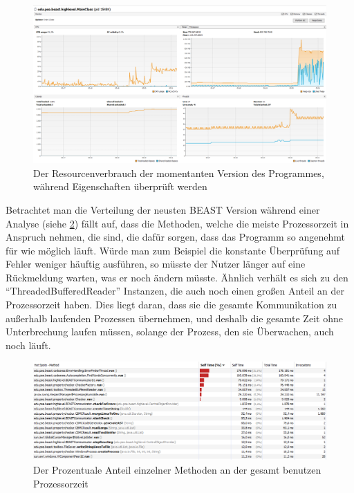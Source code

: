 ﻿\documentclass[a4paper]{scrreprt}
\begin{document}
\vspace{4cm}

\begin{figure}[ht]
	\centering
  \includegraphics[width=1.0\textwidth,
  height=0.40\textwidth]{images/NEW_YES.png} \caption{Der Resourcenverbrauch der
  momentanten Version des Programmes, während Eigenschaften überprüft werden}
	\label{fig4}
\end{figure}

\newpage
Betrachtet man die Verteilung der neusten BEAST Version während einer
Analyse (siehe \ref{fig5}) fällt auf, dass die Methoden, welche die meiste
Prozessorzeit in Anspruch nehmen, die sind, die dafür sorgen, dass das Programm
so angenehmt für wie möglich läuft. Würde man zum Beispiel die konstante
Überprüfung auf Fehler weniger häuftig ausführen, so müsste der Nutzer länger auf eine
Rückmeldung warten, was er noch ändern müsste. Ähnlich verhält es sich zu den
"`ThreadedBufferedReader"' Instanzen, die auch noch einen großen Anteil an der
Prozessorzeit haben. Dies liegt daran, dass sie die gesamte Kommunikation zu
außerhalb laufenden Prozessen übernehmen, und deshalb die gesamte Zeit ohne
Unterbrechung laufen müssen, solange der Prozess, den sie Überwachen, auch noch
läuft.

\begin{figure}[ht]
	\centering
  \includegraphics[width=1.0\textwidth,
  height=0.40\textwidth]{images/BEAST_PROCESSORTIME.png} \caption{Der
  Prozentuale Anteil einzelner Methoden an der gesamt benutzen Prozessorzeit}
	\label{fig5}
\end{figure}
\end{document}

